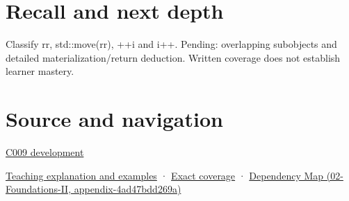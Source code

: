 \section{Recall and next depth}\label{appendix-1121b30eaeb0-recall-and-next-depth}

Classify rr, std::move(rr), ++i and i++. Pending: overlapping subobjects and detailed materialization/return deduction. Written coverage does not establish learner mastery.

\section{Source and navigation}\label{appendix-1121b30eaeb0-source-and-navigation}

\hyperref[appendix-fd090d982a15-m009---parts-127-147]{C009 development}

\href{Continuous\%20Notes/Computing\%20Foundations\%20-\%20From\%20Bits\%20to\%20C++\%20and\%20Systems\%20APIs\#An\%20expression\%20has\%20a\%20type\%20and\%20a\%20category}{Teaching explanation and examples} · \hyperref[appendix-fd090d982a15-m008---parts-113-126]{Exact coverage} · \href{../02-Foundations-II/main.pdf\#nameddest=appendix-4ad47bdd269a}{Dependency Map (02-Foundations-II, appendix-4ad47bdd269a)}
